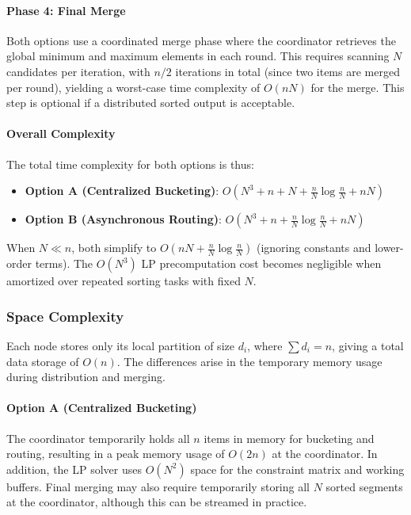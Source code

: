 \documentclass[]{interact}
\theoremstyle{plain}
\theoremstyle{definition}
\theoremstyle{remark}
\begin{document}
\paragraph{Phase 4: Final Merge}
Both options use a coordinated merge phase where the coordinator retrieves the global minimum and maximum elements in each round. This requires scanning $N$ candidates per iteration, with $n/2$ iterations in total (since two items are merged per round), yielding a worst-case time complexity of $O(nN)$ for the merge. This step is optional if a distributed sorted output is acceptable.

\paragraph{Overall Complexity}
The total time complexity for both options is thus:

\begin{itemize}
    \item \textbf{Option A (Centralized Bucketing)}: $O(N^3 + n + N + \frac{n}{N} \log \frac{n}{N} + nN)$
    \item \textbf{Option B (Asynchronous Routing)}: $O(N^3 + n + \frac{n}{N} \log \frac{n}{N} + nN)$
\end{itemize}

When $N \ll n$, both simplify to $O(nN + \frac{n}{N} \log \frac{n}{N})$ (ignoring constants and lower-order terms). The $O(N^3)$ LP precomputation cost becomes negligible when amortized over repeated sorting tasks with fixed $N$.

\subsubsection{Space Complexity}
Each node stores only its local partition of size $d_i$, where $\sum d_i = n$, giving a total data storage of $O(n)$. The differences arise in the temporary memory usage during distribution and merging.

\paragraph{Option A (Centralized Bucketing)}
The coordinator temporarily holds all $n$ items in memory for bucketing and routing, resulting in a peak memory usage of $O(2n)$ at the coordinator. In addition, the LP solver uses $O(N^2)$ space for the constraint matrix and working buffers. Final merging may also require temporarily storing all $N$ sorted segments at the coordinator, although this can be streamed in practice.
\end{document}
